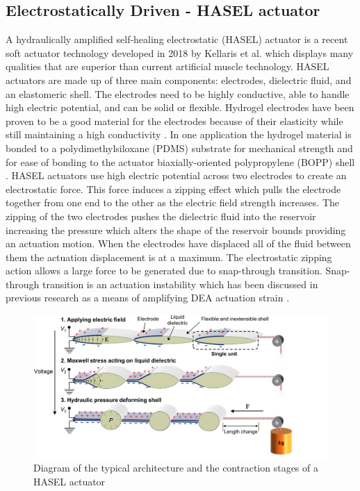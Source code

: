 \subsection{Electrostatically Driven - HASEL actuator}
\label{subsec:hasel-actuator}
A hydraulically amplified self‐healing electrostatic (HASEL) actuator is a recent soft actuator technology developed in 2018 by Kellaris et al.\citep{Kellaris2018} which displays many qualities that are superior than current artificial muscle technology. HASEL actuators are made up of three main components: electrodes, dielectric fluid, and an elastomeric shell. The electrodes need to be highly conductive, able to handle high electric potential, and can be solid or flexible. Hydrogel electrodes have been proven to be a good material for the electrodes because of their elasticity while still maintaining a high conductivity \citep{Acome2018}. In one application the hydrogel material is bonded to a polydimethylsiloxane (PDMS) substrate for mechanical strength and for ease of bonding to the actuator biaxially-oriented polypropylene (BOPP) shell \citep{Kellaris2018,Yuk2016}. HASEL actuators use high electric potential across two electrodes to create an electrostatic force. This force induces a zipping effect which pulls the electrode together from one end to the other as the electric field strength increases. The zipping of the two electrodes pushes the dielectric fluid into the reservoir increasing the pressure which alters the shape of the reservoir bounds providing an actuation motion. When the electrodes have displaced all of the fluid between them the actuation displacement is at a maximum. The electrostatic zipping action allows a large force to be generated due to snap-through transition. Snap-through transition is an actuation instability which has been discussed in previous research as a means of amplifying DEA actuation strain \citep{Keplinger2012}. 
\begin{figure}[H]
	\centering
	\includegraphics[width=0.7\linewidth]{Figures/HASEL_actuator_crop.jpg}
	\caption{Diagram of the typical architecture and the contraction stages of a HASEL actuator \citep{Kellaris2018}}
	\label{fig:Artificial Muscle_HASEL}
\end{figure}

